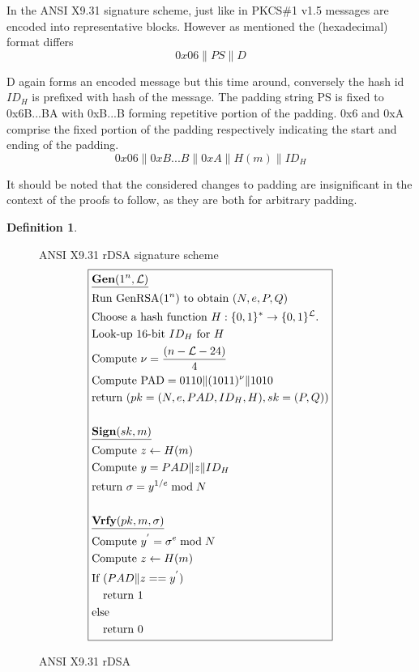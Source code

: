 \documentclass[]{final_report}
\theoremstyle{definition}
\newtheorem{definition}{Definition}[chapter]
\begin{document}
In the ANSI X9.31 signature scheme,  just like in PKCS\#1 v1.5 messages are encoded into representative blocks. However as mentioned the (hexadecimal) format differs
\[0x06\|PS\|D\]

D again forms an encoded message but this time around, conversely the hash id $ID_{H}$ is prefixed with hash of the message.  The padding string PS is fixed to 0x6B...BA with 0xB...B forming repetitive portion of the padding. 0x6 and 0xA comprise the fixed  portion of the padding respectively indicating the start and ending of the padding. 
\[0x06\|0xB . . . B\|0xA\|H(m)\|ID_{H}\]

It should be noted that the considered changes to padding are insignificant in the context of the proofs to follow, as they are both for arbitrary padding.


\begin{definition}
\begin{figure}[H]
\centering
\hfill ANSI X9.31 rDSA signature scheme\hfill\phantom{} 
\[
\boxed{
\begin{aligned}
&\underline{\textbf{\text{Gen}} (1^n, \mathcal{L})} \\
&\text{Run GenRSA}(1^n) \text{ to obtain } (N, e, P, Q) \\
&\text{Choose a hash function } H : \{0, 1\}^* \rightarrow \{0, 1\}^\mathcal{L}. \\
&\text{Look-up } 16\text{-bit } ID_{H} \text{ for } H \\
&\text{Compute } \nu = \frac{(n - \mathcal{L} - 24)}{4} \\
&\text{Compute PAD} = 0110 \| (1011)^{\nu} \| 1010 \\
&\text{return } (pk = (N, e, PAD, ID_{H}, H), sk = (P, Q)) \\
\\
&\underline{\textbf{\text{Sign}} (sk, m)} \\
&\text{Compute } z \leftarrow H(m) \\
&\text{Compute } y = PAD  \| z \| ID_{H} \\
&\text{return } \sigma = y^{1/e} \bmod N \\
\\
&\underline{\textbf{\text{Vrfy}} (pk, m, \sigma)} \\
&\text{Compute } y^{'} = \sigma^{e} \bmod N \\
&\text{Compute } z \leftarrow H(m) \\
&\text{If } (PAD \| z == y^{'}) \\
&\quad \text{return } 1 \\
&\text{else} \\
&\quad \text{return } 0 
\end{aligned}
}
\]
\caption{ANSI X9.31 rDSA}
\label{fig:ansix931}
\end{figure}
\end{definition}
\end{document}
